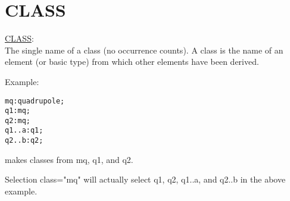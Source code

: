\section{CLASS}
\label{sec:range_class}
\href{class}{CLASS}:\\ 
The single name of a class (no occurrence counts). A class is the name
of an element (or basic type) from which other elements have been
derived. 

Example: 
\begin{verbatim}
mq:quadrupole;
q1:mq;
q2:mq;
q1..a:q1;
q2..b:q2;
\end{verbatim} 
makes classes from mq, q1, and q2. 

Selection class="mq" will actually select q1, q2, q1..a, and q2..b in the above example. 


